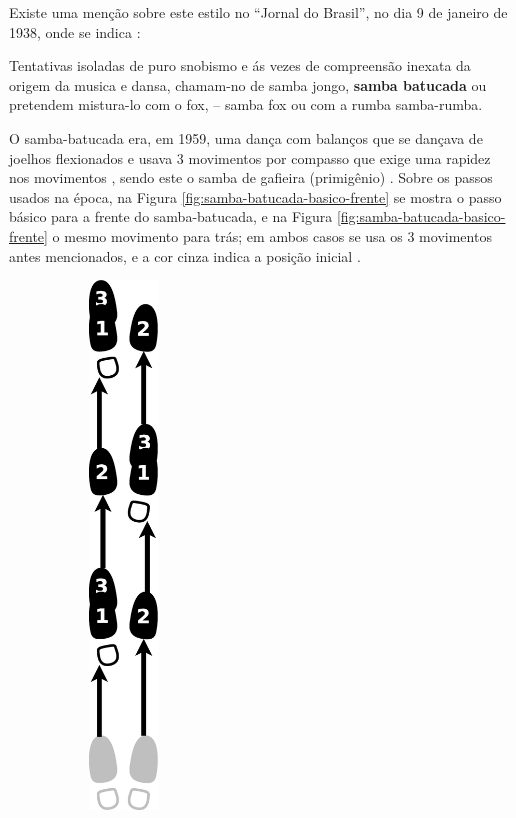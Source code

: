 \begin{itemize}
Existe uma menção sobre este estilo no ``Jornal do Brasil'', no dia 9 de janeiro de 1938,
onde se indica \cite[pp. 4]{musicasambavariasdef1}:
\begin{citando}%
Tentativas isoladas de puro 
snobismo e ás vezes de compreensão 
inexata da origem da 
musica e dansa, chamam-no de samba jongo, \textbf{samba batucada} ou
pretendem mistura-lo com o fox, -- samba fox ou com a rumba samba-rumba.
\end{citando}

O samba-batucada era, em 1959, uma dança com balanços que se dançava de joelhos flexionados  
e usava 3 movimentos por compasso que exige uma rapidez nos movimentos \cite[pp. 58,66]{freitas1959danca},
sendo este o samba de gafieira (primigênio) \cite[pp. 143]{perna2002samba}.
Sobre os passos usados na época, 
na Figura \ref{fig:samba-batucada-basico-frente} se mostra o passo básico para a frente do samba-batucada,
e na  Figura \ref{fig:samba-batucada-basico-frente} o mesmo movimento para trás;
em ambos casos se usa os 3 movimentos antes mencionados, e a cor cinza indica a posição inicial \cite[pp. 63]{freitas1959danca}. 
\begin{figure}[h]
    \centering
    \begin{subfigure}[b]{0.3\textwidth}
        \centering
        \includegraphics[width=0.2\textwidth]{chapters/cap-historia-sambagafieira/samba-batucada-basico-frente.eps}

\end{subfigure}
\end{figure}
\end{itemize}
